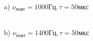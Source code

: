 \documentclass[a4paper,12pt]{article} %
\begin{document}
\begin{figure}[h!]
\begin{minipage}[h!]{0.47\linewidth}
 a) $\nu_{повт} = 1000 Гц, \tau = 50 мкс$\\
\end{minipage}
\hfill
\begin{minipage}[h!]{0.47\linewidth}
 \\b) $\nu_{повт} = 1400 Гц, \tau = 50 мкс$
\end{minipage}
\vfill
\begin{minipage}[h!]{0.47\linewidth}

\end{minipage}
\end{figure}
\end{document}
